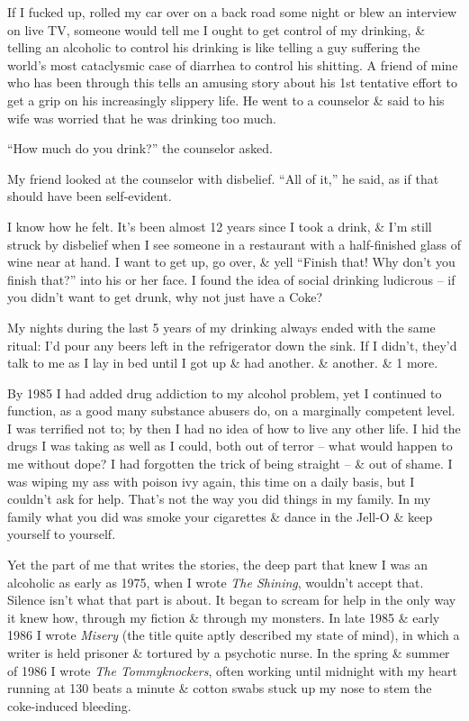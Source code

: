 \documentclass{article}
\numberwithin{equation}{section}
\begin{document}
If I fucked up, rolled my car over on a back road some night or blew an interview on live TV, someone would tell me I ought to get control of my drinking, \& telling an alcoholic to control his drinking is like telling a guy suffering the world's most cataclysmic case of diarrhea to control his shitting. A friend of mine who has been through this tells an amusing story about his 1st tentative effort to get a grip on his increasingly slippery life. He went to a counselor \& said to his wife was worried that he was drinking too much.

``How much do you drink?'' the counselor asked.

My friend looked at the counselor with disbelief. ``All of it,'' he said, as if that should have been self-evident.

I know how he felt. It's been almost 12 years since I took a drink, \& I'm still struck by disbelief when I see someone in a restaurant with a half-finished glass of wine near at hand. I want to get up, go over, \& yell ``Finish that! Why don't you finish that?'' into his or her face. I found the idea of social drinking ludicrous -- if you didn't want to get drunk, why not just have a Coke?

My nights during the last 5 years of my drinking always ended with the same ritual: I'd pour any beers left in the refrigerator down the sink. If I didn't, they'd talk to me as I lay in bed until I got up \& had another. \& another. \& 1 more.

 By 1985 I had added drug addiction to my alcohol problem, yet I continued to function, as a good many substance abusers do, on a marginally competent level. I was terrified not to; by then I had no idea of how to live any other life. I hid the drugs I was taking as well as I could, both out of terror -- what would happen to me without dope? I had forgotten the trick of being straight -- \& out of shame. I was wiping my ass with poison ivy again, this time on a daily basis, but I couldn't ask for help. That's not the way you did things in my family. In my family what you did was smoke your cigarettes \& dance in the Jell-O \& keep yourself to yourself.

Yet the part of me that writes the stories, the deep part that knew I was an alcoholic as early as 1975, when I wrote \textit{The Shining}, wouldn't accept that. Silence isn't what that part is about. It began to scream for help in the only way it knew how, through my fiction \& through my monsters. In late 1985 \& early 1986 I wrote \textit{Misery} (the title quite aptly described my state of mind), in which a writer is held prisoner \& tortured by a psychotic nurse. In the spring \& summer of 1986 I wrote \textit{The Tommyknockers}, often working until midnight with my heart running at 130 beats a minute \& cotton swabs stuck up my nose to stem the coke-induced bleeding.
\end{document}

